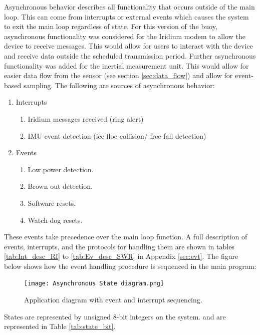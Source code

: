 Asynchronous behavior describes all functionality that occurs outside of the main loop. This can come from interrupts or external events which causes the system to exit the main loop regardless of state. For this version of the buoy, asynchronous functionality was considered for the Iridium modem to allow the device to receive messages. This would allow for users to interact with the device and receive data outside the scheduled transmission period. Further asynchronous functionality was added for the inertial measurement unit. This would allow for easier data flow from the sensor (see section \ref{sec:data_flow}) and allow for event-based sampling. The following are sources of  asynchronous behavior:

\begin{enumerate}
	\item Interrupts
	\begin{enumerate}
		\item Iridium messages received (ring alert)
		\item IMU event detection (ice floe collision/ free-fall detection)
	\end{enumerate}
	\item Events
	\begin{enumerate}
		\item Low power detection.
		\item Brown out detection.
		\item Software resets.
		\item Watch dog resets.
	\end{enumerate}
\end{enumerate}

These events take precedence over the main loop function. A full description of events, interrupts, and the protocols for handling them are shown in tables \ref{tab:Int_desc_RI} to \ref{tab:Ev_desc_SWR} in Appendix \ref{sec:evt}. The figure below shows how the event handling procedure is sequenced in the main program:

\begin{figure}[H]
	\centering
	\texttt{[image: Asynchronous State diagram.png]}
	\caption{Application diagram with event and interrupt sequencing.}
	\label{fig:main software}
\end{figure}

States are represented by unsigned 8-bit integers on the system. and are represented in Table \ref{tab:state_bit}.

